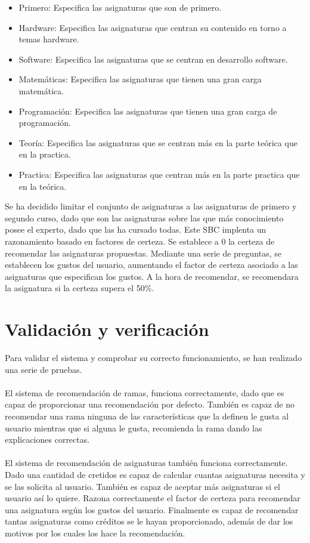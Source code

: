 \begin{itemize}
   \item Primero: Especifica las asignaturas que son de primero.
   \item Hardware: Especifica las asignaturas que centran su contenido en torno a temas hardware.
   \item Software: Especifica las asignaturas que se centran en desarrollo software.
   \item Matemáticas: Especifica las asignaturas que tienen una gran carga matemática.
   \item Programación: Especifica las asignaturas que tienen una gran carga de programación.
   \item Teoría: Especifica las asignaturas que se centran más en la parte teórica que en la practica.
   \item Practica: Especifica las asignaturas que centran más en la parte practica que en la teórica.
\end{itemize}

Se ha decidido limitar el conjunto de asignaturas a las asignaturas de primero y segundo curso, dado que son las asignaturas sobre las que más conocimiento posee el experto, dado que las ha cursado todas.
Este SBC implenta un razonamiento basado en factores de certeza. Se establece a 0 la certeza de recomendar las asignaturas propuestas. Mediante una serie de preguntas, se establecen los gustos del usuario, aumentando el factor de certeza asociado a las asignaturas que especifican los gustos. A la hora de recomendar, se recomendara la asignatura si la certeza supera el 50\%.

\section{Validación y verificación}
Para validar el sistema y comprobar su correcto funcionamiento, se han realizado una serie de pruebas.
\\\\
El sistema de recomendación de ramas, funciona correctamente, dado que es capaz de proporcionar una recomendación por defecto. También es capaz de no recomendar una rama ninguna de las características que la definen le gusta al usuario mientras que si alguna le gusta, recomienda la rama dando las explicaciones correctas.
\\\\
El sistema de recomendación de asignaturas también funciona correctamente. Dado una cantidad de cretidos es capaz de calcular cuantas asignaturas necesita y se las solicita al usuario. También es capaz de aceptar más asignaturas si el usuario así lo quiere. Razona correctamente el factor de certeza para recomendar una asignatura según los gustos del usuario. Finalmente es capaz de recomendar tantas asignaturas como créditos se le hayan proporcionado, además de dar los motivos por los cuales los hace la recomendación.

